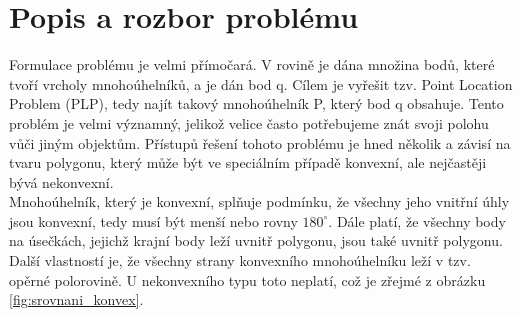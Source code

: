 \documentclass[a4paper,11pt,twoside]{article}
\begin{document}



\renewcommand{\baselinestretch}{1.35} %
\newpage
\tableofcontents %

\newpage
\listoffigures %

\thispagestyle{empty}
\newcommand{\obrazek}[1]{(viz obr. \ref{#1})} %

\newpage
\pagestyle{fancy}


\renewcommand{\sectionmark}[1]{\markright{\ #1}}

\fancyhf{} %
\renewcommand{\headrulewidth}{0.4pt} %
\renewcommand{\footrulewidth}{0.4pt}  %
\addtolength{\voffset}{-0.4cm}

\fancyhead[RE, RO]{\nouppercase{\rightmark}}
   
\fancyfoot[RO, LE]{{\textsc{\small \thepage}}}

\fancypagestyle{plain}{
  \fancyhead{} %
  \renewcommand{\headrulewidth}{0pt} %
}



\newpage
\pagestyle{fancy}

\vspace*{-1cm}
\section{Popis a rozbor problému}
\noindent
\large
Formulace problému je velmi přímočará. V rovině je dána množina bodů, které tvoří vrcholy mnohoúhelníků, a je dán bod q. Cílem je vyřešit tzv. Point Location Problem (PLP), tedy najít takový mnohoúhelník P, který bod q obsahuje. Tento problém je velmi významný, jelikož velice často potřebujeme znát svoji polohu vůči jiným objektům. Přístupů řešení tohoto problému je hned několik a závisí na tvaru polygonu, který může být ve speciálním případě konvexní, ale nejčastěji bývá nekonvexní. \\
\indent Mnohoúhelník, který je konvexní, splňuje podmínku, že všechny jeho vnitřní úhly jsou konvexní, tedy musí být menší nebo rovny $180^\circ$. Dále platí, že všechny body na úsečkách, jejichž krajní body leží uvnitř polygonu, jsou také uvnitř polygonu. Další vlastností je, že všechny strany konvexního mnohoúhelníku leží v tzv. opěrné polorovině. U nekonvexního typu toto neplatí, což je zřejmé z obrázku \ref{fig:srovnani_konvex}.
\end{document}
